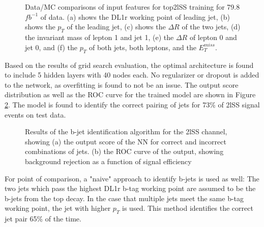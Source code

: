 \begin{figure}[H]
    \centering
    \\
    \\
    \caption{Data/MC comparisons of input features for top2lSS training for 79.8 $fb^{-1}$ of data. (a) shows the DL1r working point of leading jet, (b) shows the $p_T$ of the leading jet, (c) shows the $\Delta R$ of the two jets, (d) the invariant mass of lepton 1 and jet 1, (e) the $\Delta R$ of lepton 0 and jet 0, and (f) the $p_T$ of both jets, both leptons, and the $E_T^{miss}$.}
    \label{fig:model_top2lSS}
\end{figure}

Based on the results of grid search evaluation, the optimal architecture is found to include 5 hidden layers with 40 nodes each. No regularizer or dropout is added to the network, as overfitting is found to not be an issue. The output score distribution as well as the ROC curve for the trained model are shown in Figure \ref{fig:top2lSSresults}. The model is found to identify the correct pairing of jets for 73\% of 2lSS signal events on test data.

\begin{figure}[H]
  \centering
  \label{fig:top2lSSresults}
  \caption{Results of the b-jet identification algorithm for the 2lSS channel, showing (a) the output score of the NN for correct and incorrect combinations of jets. (b) the ROC curve of the output, showing background rejection as a function of signal efficiency}
\end{figure}

For point of comparison, a "naive" approach to identify b-jets is used as well: The two jets which pass the highest DL1r b-tag working point are assumed to be the b-jets from the top decay. In the case that multiple jets meet the same b-tag working point, the jet with higher $p_T$ is used. This method identifies the correct jet pair 65\% of the time. 

